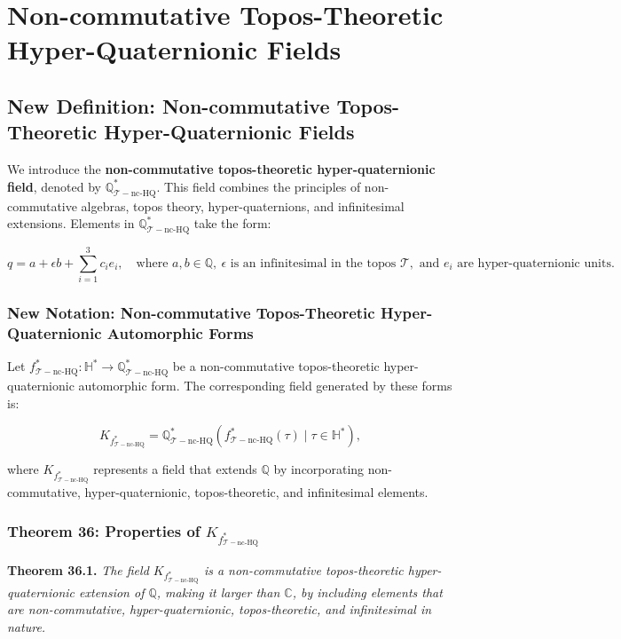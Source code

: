 \documentclass{article}
\begin{document}
\section{Non-commutative Topos-Theoretic Hyper-Quaternionic Fields}
\subsection{New Definition: Non-commutative Topos-Theoretic Hyper-Quaternionic Fields}
We introduce the \textbf{non-commutative topos-theoretic hyper-quaternionic field}, denoted by \(\mathbb{Q}_{\mathcal{T}-\text{nc-HQ}}^*\). This field combines the principles of non-commutative algebras, topos theory, hyper-quaternions, and infinitesimal extensions. Elements in \(\mathbb{Q}_{\mathcal{T}-\text{nc-HQ}}^*\) take the form:

\[
q = a + \epsilon b + \sum_{i=1}^{3} c_i e_i, \quad \text{where } a, b \in \mathbb{Q}, \ \epsilon \text{ is an infinitesimal in the topos } \mathcal{T}, \text{ and } e_i \text{ are hyper-quaternionic units}.
\]

\subsubsection{New Notation: Non-commutative Topos-Theoretic Hyper-Quaternionic Automorphic Forms}
Let \(f_{\mathcal{T}-\text{nc-HQ}}^*: \mathbb{H}^* \to \mathbb{Q}_{\mathcal{T}-\text{nc-HQ}}^*\) be a non-commutative topos-theoretic hyper-quaternionic automorphic form. The corresponding field generated by these forms is:

\[
K_{f_{\mathcal{T}-\text{nc-HQ}}^*} = \mathbb{Q}_{\mathcal{T}-\text{nc-HQ}}^*(f_{\mathcal{T}-\text{nc-HQ}}^*(\tau) \mid \tau \in \mathbb{H}^*),
\]

where \(K_{f_{\mathcal{T}-\text{nc-HQ}}^*}\) represents a field that extends \(\mathbb{Q}\) by incorporating non-commutative, hyper-quaternionic, topos-theoretic, and infinitesimal elements.

\subsubsection{Theorem 36: Properties of \(K_{f_{\mathcal{T}-\text{nc-HQ}}^*}\)}
\textbf{Theorem 36.1.} \textit{The field \(K_{f_{\mathcal{T}-\text{nc-HQ}}^*}\) is a non-commutative topos-theoretic hyper-quaternionic extension of \(\mathbb{Q}\), making it larger than \(\mathbb{C}\), by including elements that are non-commutative, hyper-quaternionic, topos-theoretic, and infinitesimal in nature.}
\end{document}

